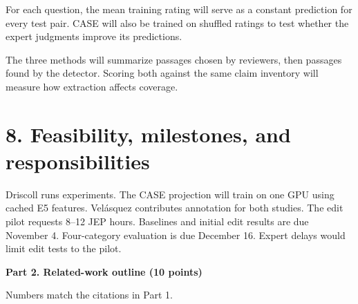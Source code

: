 \documentclass[11pt,letterpaper]{article}
\begin{document}
For each question, the mean training rating will serve as a constant prediction for every test pair. CASE will also be trained on shuffled ratings to test whether the expert judgments improve its predictions.

The three methods will summarize passages chosen by reviewers, then passages found by the detector. Scoring both against the same claim inventory will measure how extraction affects coverage.

\section{8. Feasibility, milestones, and responsibilities}
Driscoll runs experiments. The CASE projection will train on one GPU using cached E5 features. Vel\'asquez contributes annotation for both studies. The edit pilot requests 8--12 JEP hours. Baselines and initial edit results are due November 4. Four-category evaluation is due December 16. Expert delays would limit edit tests to the pilot.

\clearpage
\setlength{\parskip}{5pt}
\titlespacing*{\section}{0pt}{9pt}{3pt}
\textbf{Part 2. Related-work outline (10 points)}

Numbers match the citations in Part 1.
\end{document}
